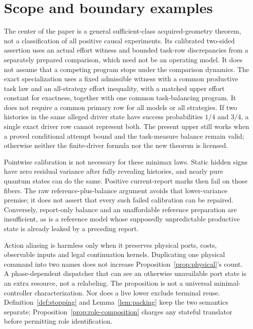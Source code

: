 \section{Scope and boundary examples}
\label{sec:scope}
The center of the paper is a general sufficient-class acquired-geometry theorem, not a classification of all positive causal experiments. Its calibrated two-sided assertion uses an actual effort witness and bounded task-row discrepancies from a separately prepared comparison, which need not be an operating model. It does not assume that a competing program stops under the comparison dynamics. The exact specialization uses a fixed admissible witness with a common productive task law and an all-strategy effort inequality, with a matched upper effort constant for exactness, together with one common task-balancing program. It does not require a common primary row for all models or all strategies. If two histories in the same alleged driver state have success probabilities $1/4$ and $3/4$, a single exact driver row cannot represent both. The present upper still works when a proved conditional attempt bound and the task-measure balance remain valid; otherwise neither the finite-driver formula nor the new theorem is licensed.

Pointwise calibration is not necessary for these minimax laws. Static hidden signs have zero residual variance after fully revealing histories, and nearly pure quantum states can do the same. Positive current-report marks then fail on those fibers. The raw reference-plus-balance argument avoids that lower-variance premise; it does not assert that every such failed calibration can be repaired. Conversely, report-only balance and an unaffordable reference preparation are insufficient, as is a reference model whose supposedly unpredictable productive state is already leaked by a preceding report.

Action aliasing is harmless only when it preserves physical ports, costs, observable inputs and legal continuation kernels. Duplicating one physical command into two names does not increase Proposition~\ref{prop:physical}'s count. A phase-dependent dispatcher that can see an otherwise unavailable port state is an extra resource, not a relabeling. The proposition is not a universal minimal-controller characterization. Nor does a live lower exclude terminal reuse. Definition~\ref{def:stopping} and Lemma~\ref{lem:packing} keep the two semantics separate; Proposition~\ref{prop:role-composition} charges any stateful translator before permitting role identification.

